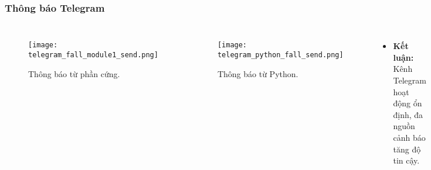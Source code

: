 \begin{frame}[t,fragile]
\frametitle{Thông báo Telegram}
\begin{columns}[T]
    \begin{figure}[H]
        \centering
        \texttt{[image: telegram\_fall\_module1\_send.png]}
        \caption{Thông báo từ phần cứng.}
    \end{figure}
    \begin{figure}[H]
        \centering
        \texttt{[image: telegram\_python\_fall\_send.png]}
        \caption{Thông báo từ Python.}
    \end{figure}
    \vspace{2mm}
    \begin{itemize}
        \item \textbf{Kết luận:} Kênh Telegram hoạt động ổn định, đa nguồn cảnh báo tăng độ tin cậy.
    \end{itemize}
\end{columns}
\end{frame}
